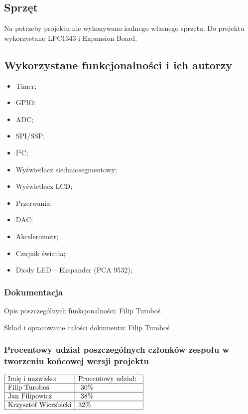 \documentclass[a4paper,12pt,twoside]{article}
\theoremstyle{plain}
\theoremstyle{definition}
\theoremstyle{remark}
\begin{document}
\subsection{Sprzęt}
Na potrzeby projektu nie wykonywano żadnego własnego sprzętu.
Do projektu wykorzystano LPC1343 i Expansion Board.
\subsection{Wykorzystane funkcjonalności i ich autorzy}

\begin{itemize}
	\item Timer;
	\item GPIO;
	\item ADC;
	\item SPI/SSP;
	\item I$^2$C;
	\item Wyświetlacz siedmiosegmentowy;
	\item Wyświetlacz LCD;
	\item Przerwania;
	\item DAC;
	\item Akcelerometr;
	\item Czujnik światła;
	\item Diody LED -- Ekspander (PCA 9532);
\end{itemize}
\subsubsection{Dokumentacja}
Opis poszczególnych funkcjonalności: Filip Turoboś

Skład i opracowanie całości dokumentu: Filip Turoboś

\subsubsection{Procentowy udział poszczególnych członków zespołu w tworzeniu końcowej wersji projektu}
$\begin{array}{|l|l|l|}
\hline
\textrm{Imię i nazwisko: }& \textrm{Procentowy udział: }\\
\hline
 \textrm{Filip Turoboś}&\textrm{ 30\%}\\
\hline
\textrm{Jan Filipowicz}&\textrm{	38\% 	}\\
\hline
\textrm{Krzysztof Wierzbicki}& \textrm{32\%}\\
\hline
\end{array}$
\newpage
\end{document}
